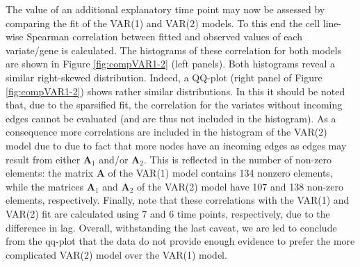 The value of an additional explanatory time point may now be assessed by comparing the fit of the VAR(1) and VAR(2) models. To this end the cell line-wise Spearman correlation between fitted and observed values of each variate/gene is calculated. The histograms of these correlation for both models are shown in Figure \ref{fig:compVAR1-2} (left panels). Both histograms reveal a similar right-skewed distribution. Indeed, a QQ-plot (right panel of Figure \ref{fig:compVAR1-2}) shows rather similar distributions. In this it should be noted that, due to the sparsified fit, the correlation for the variates without incoming edges cannot be evaluated (and are thus not included in the histogram). As a consequence more correlations are included in the histogram of the VAR(2) model due to due to fact that more nodes have an incoming edges as edges may result from either $\mathbf{A}_1$ and/or $\mathbf{A}_2$. This is reflected in the number of non-zero elements: the matrix $\mathbf{A}$ of the VAR(1) model contains 134 nonzero elements, while the matrices $\mathbf{A}_1$ and $\mathbf{A}_2$ of the VAR(2) model have 107 and 138 non-zero elements, respectively. Finally, note that these correlations with the VAR(1) and VAR(2) fit are calculated using 7 and 6 time points, respectively, due to the difference in lag. Overall, withstanding the last caveat, we are led to conclude from the qq-plot that the data do not provide enough evidence to prefer the more complicated VAR(2) model over the VAR(1) model.


